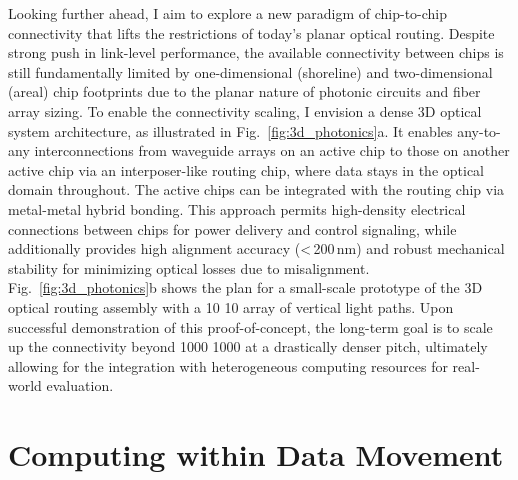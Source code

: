 Looking further ahead, I aim to explore a new paradigm of chip-to-chip connectivity that lifts the restrictions of today's planar optical routing. Despite strong push in link-level performance, the available connectivity between chips is still fundamentally limited by one-dimensional (shoreline) and two-dimensional (areal) chip footprints due to the planar nature of photonic circuits and fiber array sizing. To enable the connectivity scaling, I envision a dense 3D optical system architecture, as illustrated in Fig.~\ref{fig:3d_photonics}a. It enables any-to-any interconnections from waveguide arrays on an active chip to those on another active chip via an interposer-like routing chip, where data stays in the optical domain throughout. The active chips can be integrated with the routing chip via metal-metal hybrid bonding. This approach permits high-density electrical connections between chips for power delivery and control signaling, while
additionally provides high alignment accuracy (<\,200\,nm) and robust mechanical stability for minimizing optical losses due to misalignment. Fig.~\ref{fig:3d_photonics}b shows the plan for a small-scale prototype of the 3D optical routing assembly with a 10 \texttimes{} 10 array of vertical light paths. Upon successful demonstration of this proof-of-concept, the long-term goal is to scale up the connectivity beyond 1000 \texttimes{} 1000 at a drastically denser pitch, ultimately allowing for the integration with heterogeneous computing resources for real-world evaluation.

\section*{Computing within Data Movement}